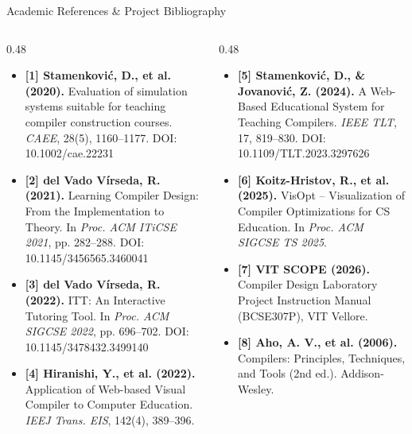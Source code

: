 \documentclass[aspectratio=169,10pt]{beamer}
\begin{document}
\begin{frame}{Academic References \& Project Bibliography}
    \begin{columns}[T]
        \begin{column}{0.48\textwidth}
            \begin{itemize}\tiny
                \item \textbf{[1] Stamenkovi\'c, D., et al. (2020).} Evaluation of simulation systems suitable for teaching compiler construction courses. \textit{CAEE}, 28(5), 1160--1177. DOI: 10.1002/cae.22231
                \item \textbf{[2] del Vado V\'irseda, R. (2021).} Learning Compiler Design: From the Implementation to Theory. In \textit{Proc. ACM ITiCSE 2021}, pp. 282--288. DOI: 10.1145/3456565.3460041
                \item \textbf{[3] del Vado V\'irseda, R. (2022).} ITT: An Interactive Tutoring Tool. In \textit{Proc. ACM SIGCSE 2022}, pp. 696--702. DOI: 10.1145/3478432.3499140
                \item \textbf{[4] Hiranishi, Y., et al. (2022).} Application of Web-based Visual Compiler to Computer Education. \textit{IEEJ Trans. EIS}, 142(4), 389--396.
            \end{itemize}
        \end{column}
        \begin{column}{0.48\textwidth}
            \begin{itemize}\tiny
                \item \textbf{[5] Stamenkovi\'c, D., \& Jovanovi\'c, Z. (2024).} A Web-Based Educational System for Teaching Compilers. \textit{IEEE TLT}, 17, 819--830. DOI: 10.1109/TLT.2023.3297626
                \item \textbf{[6] Koitz-Hristov, R., et al. (2025).} VisOpt -- Visualization of Compiler Optimizations for CS Education. In \textit{Proc. ACM SIGCSE TS 2025}.
                \item \textbf{[7] VIT SCOPE (2026).} Compiler Design Laboratory Project Instruction Manual (BCSE307P), VIT Vellore.
                \item \textbf{[8] Aho, A. V., et al. (2006).} Compilers: Principles, Techniques, and Tools (2nd ed.). Addison-Wesley.
            \end{itemize}
        \end{column}
    \end{columns}
\end{frame}
\end{document}
